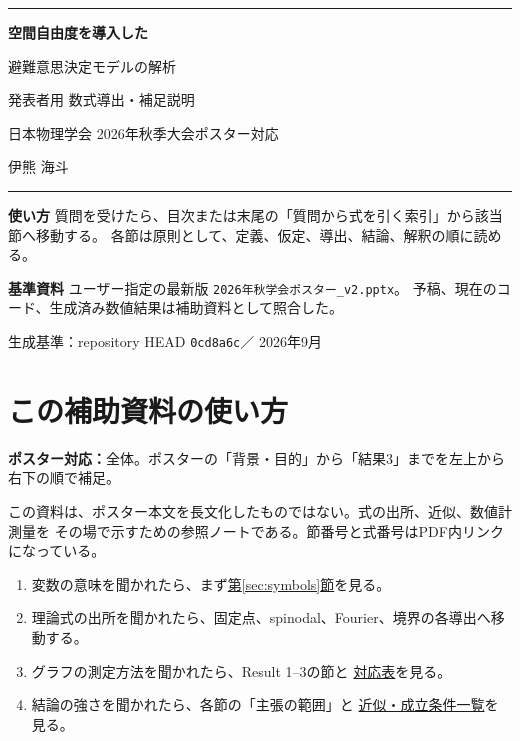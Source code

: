 \documentclass[a4paper,12pt]{ltjsarticle}
\newcommand{\PosterMap}[1]{%
  \begin{tcolorbox}[enhanced,boxrule=0pt,arc=1mm,colback=softgray,
    left=2mm,right=2mm,top=1mm,bottom=1mm,before skip=0pt,after skip=0.7em]
  \normalsize\textbf{ポスター対応：}#1
  \end{tcolorbox}}
\begin{document}

\begin{titlepage}
  \centering
  \vspace*{12mm}
  {\color{navy}\rule{\linewidth}{1.4pt}}\par
  \vspace{8mm}
  {\Huge\bfseries 空間自由度を導入した\par
  避難意思決定モデルの解析\par}
  \vspace{5mm}
  {\LARGE 発表者用 数式導出・補足説明}\par
  \vspace{8mm}
  {\large 日本物理学会 2026年秋季大会ポスター対応}\par
  \vspace{3mm}
  {\large 伊熊 海斗}\par
  \vspace{8mm}
  {\color{orange}\rule{\linewidth}{1.0pt}}\par

  \vfill
  \begin{tcolorbox}[colback=softblue,colframe=navy,arc=2mm,boxrule=0.8pt,
    width=0.92\linewidth]
    \textbf{使い方}\quad
    質問を受けたら、目次または末尾の「質問から式を引く索引」から該当節へ移動する。
    各節は原則として、定義、仮定、導出、結論、解釈の順に読める。

    \textbf{基準資料}\quad
    ユーザー指定の最新版
    \texttt{2026年秋学会ポスター\_v2.pptx}。
    予稿、現在のコード、生成済み数値結果は補助資料として照合した。
  \end{tcolorbox}
  \vfill
  {\small 生成基準：repository HEAD \texttt{0cd8a6c}\quad ／ \quad 2026年9月}
\end{titlepage}
\setcounter{page}{2}

\tableofcontents
\clearpage
{}

\section{この補助資料の使い方}\label{sec:use}
\PosterMap{全体。ポスターの「背景・目的」から「結果3」までを左上から右下の順で補足。}

この資料は、ポスター本文を長文化したものではない。式の出所、近似、数値計測量を
その場で示すための参照ノートである。節番号と式番号はPDF内リンクになっている。

\begin{enumerate}
  \item 変数の意味を聞かれたら、まず\hyperref[sec:symbols]{第\ref*{sec:symbols}節}を見る。
  \item 理論式の出所を聞かれたら、固定点、spinodal、Fourier、境界の各導出へ移動する。
  \item グラフの測定方法を聞かれたら、Result 1--3の節と
        \hyperref[sec:correspondence]{対応表}を見る。
  \item 結論の強さを聞かれたら、各節の「主張の範囲」と
        \hyperref[sec:assumptions]{近似・成立条件一覧}を見る。
\end{enumerate}
\end{document}
